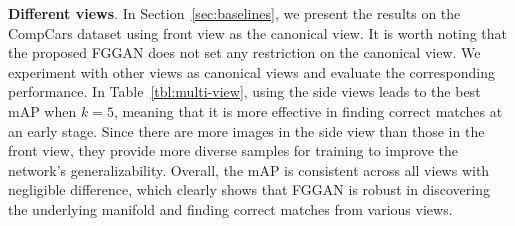 \documentclass[runningheads]{llncs}
\begin{document}
{\flushleft \textbf{Different views}.} In Section~\ref{sec:baselines}, we present the results on the CompCars dataset using front view as the canonical view. 
It is worth noting that the proposed FGGAN does not set any restriction on the canonical view. 
We experiment with other views as canonical views and evaluate the corresponding performance. 
In Table~\ref{tbl:multi-view}, using the side views leads to the best mAP when $k=5$, meaning that it is more effective in finding correct matches at an early stage.
Since there are more images in the side view than those in the front view, they provide more diverse samples for training to improve the network's generalizability.
Overall, the mAP is consistent across all views with negligible difference, which clearly shows that FGGAN is robust in discovering the underlying manifold and finding correct matches from various views. 
\end{document}
